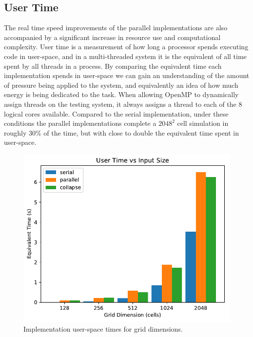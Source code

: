 \documentclass[]{article}
\begin{document}
\subsection{User Time}
The real time speed improvements of the parallel implementations are also accompanied by a significant increase in resource use and computational complexity. User time is a measurement of how long a processor spends executing code in user-space, and in a multi-threaded system it is the equivalent of all time spent by all threads in a process. By comparing the equivalent time each implementation spends in user-space we can gain an understanding of the amount of pressure being applied to the system, and equivalently an idea of how much energy is being dedicated to the task. When allowing OpenMP to dynamically assign threads on the testing system, it always assigns a thread to each of the 8 logical cores available. Compared to the serial implementation, under these conditions the parallel implementations complete a $2048^2$ cell simulation in roughly 30\% of the time, but with close to double the equivalent time spent in user-space.

\begin{figure}[h]
	\centering
	\includegraphics[width=.8\linewidth]{vecs/input_usertime.pdf}
	\caption{Implementation user-space times for grid dimensions.}
\end{figure}
\end{document}
